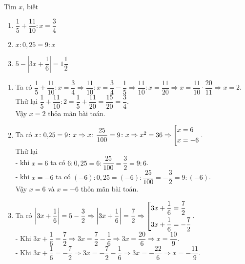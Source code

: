 		\begin{ex}%
			Tìm $x$, biết
			\begin{enumerate}
				\item $\dfrac{1}{5} + \dfrac{11}{10}\colon x  = \dfrac{3}{4}$
				\item $x\colon 0{,}25 = 9\colon x$ 
				\item $5-\left\vert 3x+\dfrac{1}{6}\right\vert = 1\dfrac{1}{2}$ 
			\end{enumerate}
			\loigiai
			{	\begin{enumerate}
					\item Ta có $\dfrac{1}{5} + \dfrac{11}{10}\colon x  = \dfrac{3}{4}\Rightarrow \dfrac{11}{10}\colon x = \dfrac{3}{4} - \dfrac{1}{5}\Rightarrow \dfrac{11}{10}\colon x = \dfrac{11}{20}\Rightarrow x = \dfrac{11}{10}\cdot \dfrac{20}{11}\Rightarrow x = 2$.\\
					Thử lại $\dfrac{1}{5} + \dfrac{11}{10}\colon 2 = \dfrac{1}{5} + \dfrac{11}{20} = \dfrac{15}{20} = \dfrac{3}{4}$.\\
					Vậy $x = 2$ thỏa mãn bài toán. 
					\item Ta có $x\colon 0{,}25 = 9\colon x\Rightarrow x\colon \dfrac{25}{100} = 9\colon x\Rightarrow x^2 = 36\Rightarrow \left[\begin{aligned}&x = 6 \\ & x = - 6\end{aligned}\right.$.\\
					Thử lại\\
					- khi $x = 6$ ta có $6\colon 0{,}25 = 6\colon \dfrac{25}{100} = \dfrac{3}{2} = 9\colon 6$.\\
					- khi $x = - 6$ ta có $(- 6)\colon 0{,}25 = (- 6)\colon \dfrac{25}{100} = - \dfrac{3}{2} = 9\colon (- 6)$.\\
					Vậy $x = 6$ và $x = - 6$ thỏa mãn bài toán.
					 \item Ta có $\left\vert 3x+\dfrac{1}{6}\right\vert = 5 -  \dfrac{3}{2}\Rightarrow \left\vert 3x+\dfrac{1}{6}\right\vert = \dfrac{7}{2}\Rightarrow \left[\begin{aligned}& 3x + \dfrac{1}{6} = \dfrac{7}{2}\\ & 3x + \dfrac{1}{6} = - \dfrac{7}{2}\end{aligned}\right.$.\\
					 - Khi  $3x + \dfrac{1}{6} = \dfrac{7}{2}\Rightarrow 3x = \dfrac{7}{2} - \dfrac{1}{6}\Rightarrow 3x = \dfrac{20}{6}\Rightarrow x = \dfrac{10}{9}$.\\
					 - Khi  $3x + \dfrac{1}{6} = - \dfrac{7}{2}\Rightarrow 3x = - \dfrac{7}{2} - \dfrac{1}{6}\Rightarrow 3x = - \dfrac{22}{6}\Rightarrow x = - \dfrac{11}{9}$.\\

\end{enumerate}}
\end{ex}
